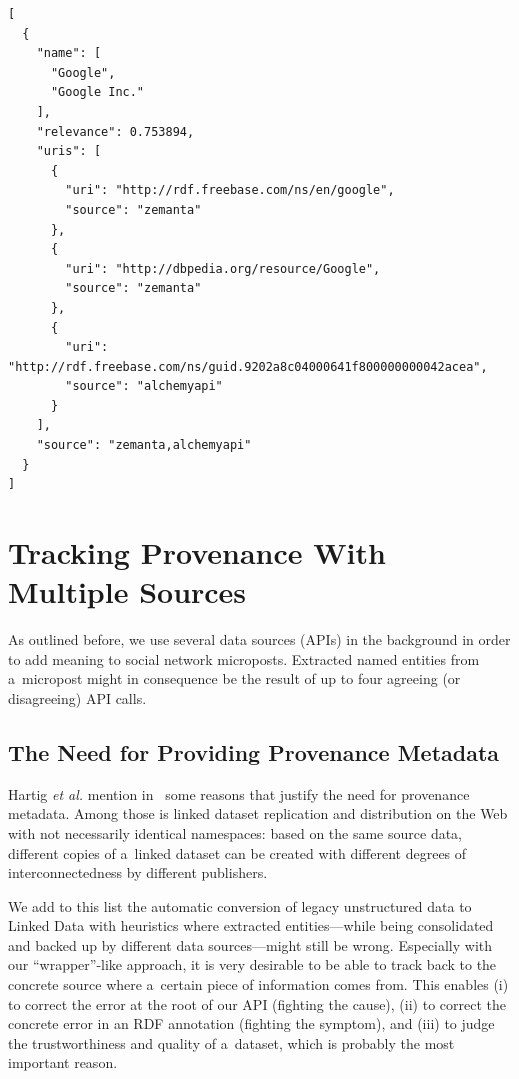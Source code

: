 \newpage

\begin{lstlisting}[caption={
   [Consolidated output of two named entity recognition APIs]
   {Consolidated output of two named entity recognition APIs,
    namely Zemanta and AlchemyAPI.}
  },
  label={code:googlecombined}]
[
  {
    "name": [
      "Google",
      "Google Inc."
    ],
    "relevance": 0.753894,
    "uris": [
      {
        "uri": "http://rdf.freebase.com/ns/en/google",
        "source": "zemanta"
      },
      {
        "uri": "http://dbpedia.org/resource/Google",
        "source": "zemanta"
      },
      {
        "uri": "http://rdf.freebase.com/ns/guid.9202a8c04000641f800000000042acea",
        "source": "alchemyapi"
      }
    ],
    "source": "zemanta,alchemyapi"
  }
]
\end{lstlisting}

\section{Tracking Provenance With Multiple Sources}                    \label{sec:tracking}

As outlined before, we use several data sources (APIs) in the background in order to add meaning to social network microposts. Extracted named entities from a~micropost might in consequence be the result of up to four agreeing (or disagreeing) API calls. 

\subsection{The Need for Providing Provenance Metadata}
Hartig \emph{et al.} mention in~\cite{ipaw10:olaf} some reasons that justify the need for provenance metadata. Among those is linked dataset replication and distribution on the Web with not necessarily identical namespaces: based on the same source data, different copies of a~linked dataset can be created with different degrees of interconnectedness by different publishers.

We add to this list the automatic conversion of legacy unstructured data to Linked Data with heuristics where extracted entities---while being consolidated and backed up by different data sources---might still be wrong. Especially with our ``wrapper''-like approach, it is very desirable to be able to track back to the concrete source where a~certain piece of information comes from. This enables (i) to correct the error at the root of our API (fighting the cause), (ii) to correct the concrete error in an RDF annotation (fighting the symptom), and (iii) to judge the trustworthiness and quality of a~dataset, which is probably the most important reason.


